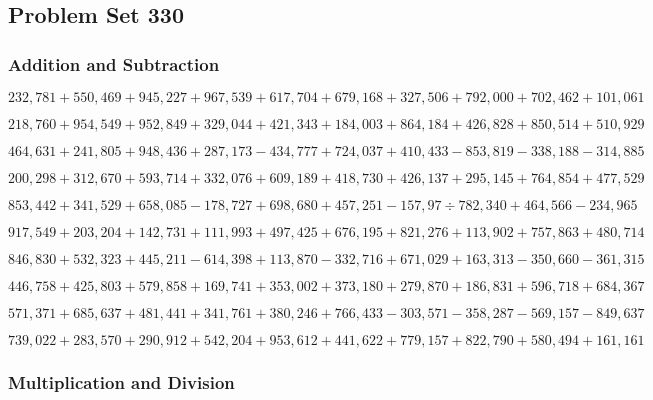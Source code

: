 \hypertarget{problem-set-330}{%
\subsection{Problem Set 330}\label{problem-set-330}}

\hypertarget{addition-and-subtraction}{%
\subsubsection{Addition and
Subtraction}\label{addition-and-subtraction}}

\(232,781+550,469+945,227+967,539+617,704+679,168+327,506+792,000+702,462+101,061\)

\(218,760+954,549+952,849+329,044+421,343+184,003+864,184+426,828+850,514+510,929\)

\(464,631+241,805+948,436+287,173-434,777+724,037+410,433-853,819-338,188-314,885\)

\(200,298+312,670+593,714+332,076+609,189+418,730+426,137+295,145+764,854+477,529\)

\(853,442+341,529+658,085-178,727+698,680+457,251-157,97÷782,340+464,566-234,965\)

\(917,549+203,204+142,731+111,993+497,425+676,195+821,276+113,902+757,863+480,714\)

\(846,830+532,323+445,211-614,398+113,870-332,716+671,029+163,313-350,660-361,315\)

\(446,758+425,803+579,858+169,741+353,002+373,180+279,870+186,831+596,718+684,367\)

\(571,371+685,637+481,441+341,761+380,246+766,433-303,571-358,287-569,157-849,637\)

\(739,022+283,570+290,912+542,204+953,612+441,622+779,157+822,790+580,494+161,161\)

\hypertarget{multiplication-and-division}{%
\subsubsection{Multiplication and
Division}\label{multiplication-and-division}}

